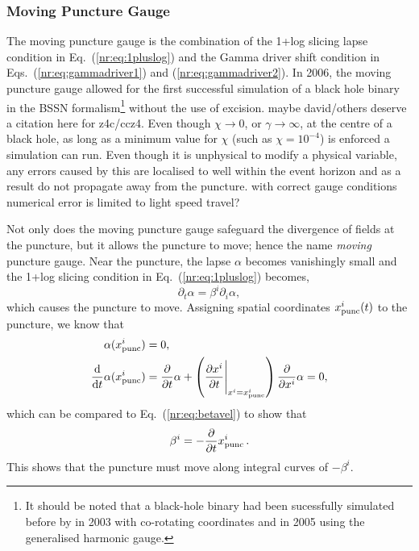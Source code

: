 \subsubsection{Moving Puncture Gauge}
The moving puncture gauge is the combination of the 1+log slicing lapse condition in Eq.~(\ref{nr:eq:1pluslog}) and the Gamma driver shift condition in Eqs.~(\ref{nr:eq:gammadriver1}) and (\ref{nr:eq:gammadriver2}). In 2006, the moving puncture gauge allowed for the first successful simulation of a black hole binary \cite{PhysRevLett.96.111101} in the \color{orchid} BSSN \color{black} formalism\footnote{It should be noted that a black-hole binary had been sucessfully simulated before by \cite{Bruegmann:2003aw} in 2003 with co-rotating coordinates and \cite{Pretorius:2005gq} in 2005 using the generalised harmonic gauge.} without the use of excision. \color{gren} maybe david/others deserve a citation here for z4c/ccz4. \color{black} Even though $\chi\rightarrow 0$, or $\gamma \rightarrow \infty$, at the centre of a black hole, as long as a minimum value for $\chi$ (such as $\chi=10^{-4}$) is enforced a simulation can run. Even though it is unphysical to modify a physical variable, any errors caused by this are localised to well within the event horizon and as a result do not propagate away from the puncture. \color{gren} with correct gauge conditions numerical error is limited to light speed travel? \color{black}

Not only does the moving puncture gauge safeguard the divergence of fields at the puncture, but it allows the puncture to move; hence the name {\it moving} puncture gauge. Near the puncture, the lapse $\alpha$ becomes vanishingly small and the 1+log slicing condition in Eq.~(\ref{nr:eq:1pluslog}) becomes,
\begin{equation}
\partial_t \alpha = \beta^i \partial_i \alpha, \label{nr:eq:betavel}
\end{equation}
which causes the puncture to move. Assigning spatial coordinates $x^i_{\rm punc}(t)$ to the puncture, we know that
\begin{align}
\alpha(x^i_{\rm punc}) &= 0,\\
\frac{\dd}{\dd t} \alpha(x^i_{\rm punc})  &= \frac{\partial}{\partial t}\alpha + \left(\frac{\partial x^i}{\partial t}\Bigg|_{x^i=x^i_{\rm punc}}\right)\frac{\partial}{\partial x^i} \alpha =0,
\end{align}
which can be compared to Eq.~(\ref{nr:eq:betavel}) to show that
\begin{equation}
\beta^i = -\frac{\partial }{\partial t}x^i_{\rm punc}\,.
\end{equation}
This shows that the puncture must move along integral curves of $-\beta^i$.



